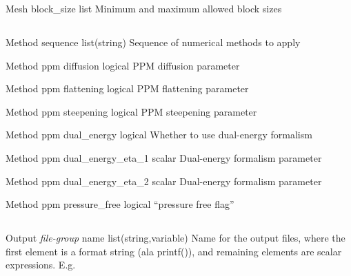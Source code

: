 \documentclass{article}
\begin{document}
\Parameter
{Mesh}
{}
{block\_size}
{list}
{}
{Minimum and maximum allowed block sizes}
{}
{}

\subsection{}

\Parameter
{Method}
{}
{sequence}
{list(string)}
{}
{Sequence of numerical methods to apply}
{}
{}

\Parameter
{Method}
{ppm}
{diffusion}
{logical}
{}
{PPM diffusion parameter}
{}
{}

\Parameter
{Method}
{ppm}
{flattening}
{logical}
{}
{PPM flattening parameter}
{}
{}

\Parameter
{Method}
{ppm}
{steepening}
{logical}
{}
{PPM steepening parameter}
{}
{}

\Parameter
{Method}
{ppm}
{dual\_energy}
{logical}
{}
{Whether to use dual-energy formalism}
{}
{}

\Parameter
{Method}
{ppm}
{dual\_energy\_eta\_1}
{scalar}
{}
{Dual-energy formalism parameter}
{}
{}

\Parameter
{Method}
{ppm}
{dual\_energy\_eta\_2}
{scalar}
{}
{Dual-energy formalism parameter}
{}
{}

\Parameter
{Method}
{ppm}
{pressure\_free}
{logical}
{}
{``pressure free flag''}
{}
{}

\subsection{}

\Parameter
{Output}
{\textit{file-group}}
{name}
{list(string,variable)}
{}
{Name for the output files, where the first element is a format string (ala printf()), and remaining elements are scalar expressions. E.g. \code{["wave\_pool-t=\%3.1f.data", t]}}
{}
{}
\end{document}
